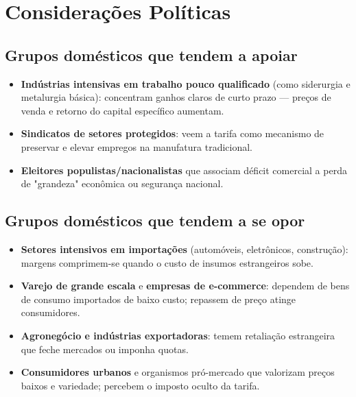\documentclass[a4paper,12pt]{article}[abntex2]
\begin{document}
\section*{\textbf{Considerações Políticas}}

\subsection*{\textbf{Grupos domésticos que tendem a apoiar}}

\begin{itemize}
    \item \textbf{Indústrias intensivas em trabalho pouco qualificado} (como siderurgia e metalurgia básica): concentram ganhos claros de curto prazo — preços de venda e retorno do capital específico aumentam.  
    \item \textbf{Sindicatos de setores protegidos}: veem a tarifa como mecanismo de preservar e elevar empregos na manufatura tradicional. 
    \item \textbf{Eleitores populistas/nacionalistas} que associam déficit comercial a perda de "grandeza" econômica ou segurança nacional.
\end{itemize}

\subsection*{\textbf{Grupos domésticos que tendem a se opor}}

\begin{itemize}
    \item \textbf{Setores intensivos em importações} (automóveis, eletrônicos, construção): margens comprimem-se quando o custo de insumos estrangeiros sobe.  
    \item \textbf{Varejo de grande escala} e \textbf{empresas de e-commerce}: dependem de bens de consumo importados de baixo custo; repassem de preço atinge consumidores.  
    \item \textbf{Agronegócio e indústrias exportadoras}: temem retaliação estrangeira que feche mercados ou imponha quotas.  
    \item \textbf{Consumidores urbanos} e organismos pró-mercado que valorizam preços baixos e variedade; percebem o imposto oculto da tarifa.
\end{itemize}
\end{document}
